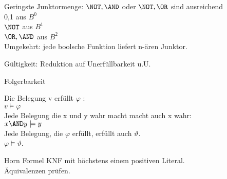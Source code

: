 
Geringste Junktormenge: $\NOT, \AND$ oder $\NOT, \OR$ sind ausreichend\\

0,1 aus $B^0$\\
$\NOT$ aus $B^1$\\
$\OR,\AND$ aus $B^2$\\
Umgekehrt: jede boolsche Funktion liefert n-ären Junktor.

Gültigkeit: Reduktion auf Unerfüllbarkeit u.U.

Folgerbarkeit

Die Belegung v erfüllt $\varphi$ :\\
$v \models \varphi$ \\
Jede Belegung die x und y wahr macht macht auch x wahr:\\
$x \AND y \models y$\\

Jede Belegung, die $\varphi$ erfüllt, erfüllt auch $\vartheta$.\\
$\varphi \models \vartheta$.

Horn Formel KNF mit höchstens einem positiven Literal.\\
Äquivalenzen prüfen.\\
